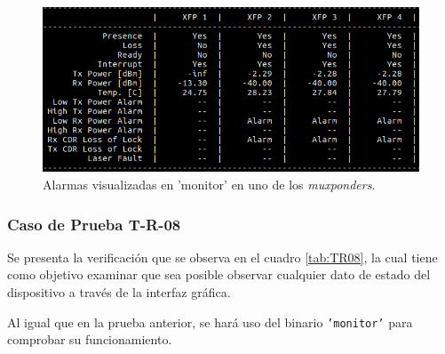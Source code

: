   \begin{figure}[H]
	\centering
	\includegraphics[scale=0.5]{Figures/test7_3.png}
	\caption{Alarmas visualizadas en 'monitor' en uno de los \textit{muxponders}.}
	\label{fig:test7_3}
  \end{figure}

  \subsubsection{Caso de Prueba T-R-08}

  Se presenta la verificación que se observa en el cuadro \ref{tab:TR08}, la cual tiene como objetivo examinar que sea posible observar cualquier dato de estado del dispositivo a través de la interfaz gráfica. 
  
  Al igual que en la prueba anterior, se hará uso del binario \texttt{'monitor'} para comprobar su funcionamiento.
  
